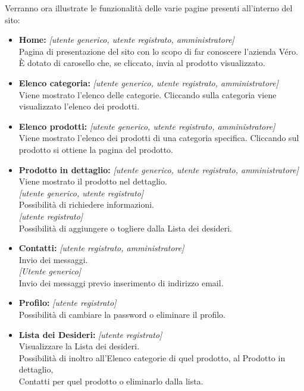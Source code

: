 \documentclass[a4paper, 11pt]{article}
\begin{document}
Verranno ora illustrate le funzionalità delle varie pagine presenti all'interno del sito:
\begin{itemize}
	\item \textbf{Home:} \textit{[utente generico, utente registrato, amministratore]} \\
	Pagina di presentazione del sito con lo scopo di far conoscere l'azienda Véro. \\
	È dotato di carosello che, se cliccato, invia al prodotto visualizzato.
	
	\item \textbf{Elenco categoria:}  \textit{[utente generico, utente registrato, amministratore]} \\
	Viene mostrato l’elenco delle categorie. Cliccando sulla categoria viene visualizzato l’elenco dei prodotti.

 	\item \textbf{Elenco prodotti:} \textit{[utente generico, utente registrato, amministratore]} \\
 	Viene mostrato l’elenco dei prodotti di una categoria specifica. Cliccando sul prodotto si ottiene la pagina del prodotto.
 	
 	\item \textbf{Prodotto in dettaglio:} \textit{[utente generico, utente registrato, amministratore]} \\
 	Viene mostrato il prodotto nel dettaglio. \\
 	\textit{[utente generico, utente registrato]} \\
 	Possibilità di richiedere informazioni. \\
	\textit{[utente registrato]} \\
	Possibilità di aggiungere o togliere dalla Lista dei desideri.
	
	\item \textbf{Contatti:} \textit{[utente registrato, amministratore]} \\
	Invio dei messaggi. \\
	\textit{[Utente generico]} \\
	Invio dei messaggi previo inserimento di indirizzo email.
	
	\item \textbf{Profilo:}	\textit{[utente registrato]} \\
	Possibilità di cambiare la password o eliminare il profilo.
	
	\item \textbf{Lista dei Desideri:}	\textit{[utente registrato]} \\
	Visualizzare la Lista dei desideri.  \\
	Possibilità di inoltro all’Elenco categorie di quel prodotto, al Prodotto in dettaglio, \\
	Contatti per quel prodotto o eliminarlo dalla lista.


\end{itemize}
\end{document}
